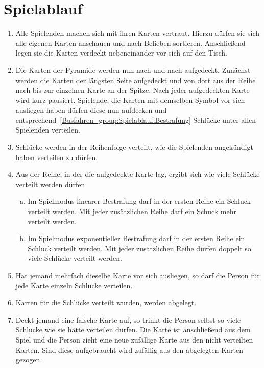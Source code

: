\section{Spielablauf}\label{Busfahren_group:Spielablauf}
\begin{enumerate}[label={(\arabic*)}]
    \item
    Alle Spielenden machen sich mit ihren Karten vertraut.
    Hierzu dürfen sie sich alle eigenen Karten anschauen und nach Belieben sortieren.
    Anschließend legen sie die Karten verdeckt nebeneinander vor sich auf den Tisch.

    \item
    Die Karten der Pyramide werden nun nach und nach aufgedeckt.
    Zunächst werden die Karten der längsten Seite aufgedeckt und von dort aus der Reihe nach bis zur einzelnen Karte an der Spitze.
    Nach jeder aufgedeckten Karte wird kurz pausiert.
    Spielende, die Karten mit demselben Symbol vor sich ausliegen haben dürfen diese nun aufdecken und entsprechend~\ref{Busfahren_group:Spielablauf:Bestrafung} Schlücke unter allen Spielenden verteilen.

    \item Schlücke werden in der Reihenfolge verteilt, wie die Spielenden angekündigt haben verteilen zu dürfen.

    \item\label{Busfahren_group:Spielablauf:Bestrafung}
    Aus der Reihe, in der die aufgedeckte Karte lag, ergibt sich wie viele Schlücke verteilt werden dürfen
    \begin{enumerate}[a.]
        \item
        Im Spielmodus linearer Bestrafung darf in der ersten Reihe ein Schluck verteilt werden.
        Mit jeder zusätzlichen Reihe darf ein Schuck mehr verteilt werden.
        \item
        Im Spielmodus exponentieller Bestrafung darf in der ersten Reihe ein Schluck verteilt werden.
        Mit jeder zusätzlichen Reihe dürfen doppelt so viele Schlücke verteilt werden.
    \end{enumerate}

    \item 
    Hat jemand mehrfach dieselbe Karte vor sich ausliegen, so darf die Person für jede Karte einzeln Schlücke verteilen.

    \item
    Karten für die Schlücke verteilt wurden, werden abgelegt.

    \item\label{Busfahren_group:Spielablauf:Ziehen}
    Deckt jemand eine falsche Karte auf, so trinkt die Person selbst so viele Schlucke wie sie hätte verteilen dürfen.
    Die Karte ist anschließend aus dem Spiel und die Person zieht eine neue zufällige Karte aus den nicht verteilten Karten.
    Sind diese aufgebraucht wird zufällig aus den abgelegten Karten gezogen.


\end{enumerate}
